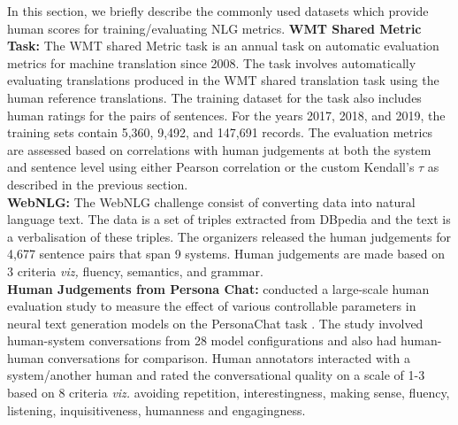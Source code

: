 In this section, we briefly describe the commonly used datasets which provide human scores for training/evaluating NLG metrics. 
\noindent \textbf{WMT Shared Metric Task:} The WMT shared Metric task is an annual task on automatic evaluation metrics for machine translation since 2008. The task involves automatically evaluating translations produced in the WMT shared translation task using the human reference translations. The training dataset for the task also includes human ratings for the pairs of sentences. For the years 2017, 2018, and 2019, the training sets contain 5,360, 9,492, and 147,691 records. The evaluation metrics are assessed based on correlations with human judgements at both the system and sentence level using either Pearson correlation or the custom Kendall's $\tau$ as described in the previous section. \\
\noindent \textbf{WebNLG:} The WebNLG challenge consist of converting data into natural language text. The data is a set of triples extracted from DBpedia and the text is a verbalisation of these triples. The organizers released the human judgements for 4,677 sentence pairs that span 9 systems. Human judgements are made based on 3 criteria \textit{viz, } fluency, semantics, and grammar. \\
\noindent \textbf{Human Judgements from Persona Chat:}   conducted a large-scale human evaluation study to measure the effect of various controllable parameters in neural text generation models on the PersonaChat task . The study involved human-system conversations from 28 model configurations and also had human-human conversations for comparison. Human annotators interacted with a system/another human and rated the conversational quality on a scale of 1-3 based on 8 criteria \textit{viz.} avoiding repetition, interestingness, making sense, fluency, listening, inquisitiveness, humanness and engagingness.

